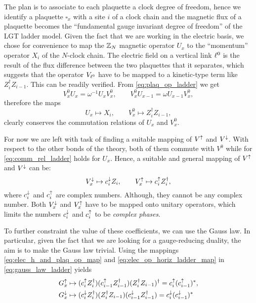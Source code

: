 The plan is to associate to each plaquette a clock degree of freedom, hence we identify a plaquette $\square_x$ with a site $i$ of a clock chain and the magnetic flux of a plaquette becomes the ``fundamental gauge invariant degree of freedom'' of the LGT ladder model.
Given the fact that we are working in the electric basis, we chose for convenience to map the $\mathbb{Z}_N$ magnetic operator $U_x$ to the ``momentum'' operator $X_i$ of the $N$-clock chain.
The electric field on a vertical link $\ell^0$ is the result of the flux difference between the two plaquettes that it separates, which suggests that the operator $V_{\ell^0}$ have to be mapped to a kinetic-type term like $Z_i^\dagger Z_{i-1}$.
This can be readily verified.
From \eqref{eq:plaq_op_ladder} we get
\begin{equation*}
    V^0_x U_x = \omega^{-1} U_x V_x^0, \qquad
    V^0_x U_{x-1} = \omega U_{x-1} V_x^0,
\end{equation*}
therefore the maps
\begin{equation*}
    U_x \mapsto X_i, \qquad
    V^0_x \mapsto Z_i^\dagger Z_{i-1},
    \label{eq:elec_h_and_plaq_op_map}
\end{equation*}
clearly conserves the commutation relations of $U_x$ and $V^0_x$.

For now we are left with task of finding a suitable mapping of $V^{\uparrow}$ and $V^{\downarrow}$.
With respect to the other bonds of the theory, both of them commute with $V^0$ while for \eqref{eq:comm_rel_ladder} holds for $U_x$.
Hence, a suitable and general mapping of $V^{\uparrow}$ and $V^{\downarrow}$ can be:
\begin{equation}
    V^{\downarrow}_x \mapsto c^{\downarrow}_i Z_i, \qquad
    V^{\uparrow}_x \mapsto c^{\uparrow}_i Z_i^\dagger,
    \label{eq:elec_op_horiz_ladder_map}
\end{equation}
where $c^{\downarrow}_i$ and $c^{\uparrow}_i$ are complex numbers.
Although, they cannot be any complex number.
Both $V^{\downarrow}_x$ and $V^{\uparrow}_x$ have to be mapped onto unitary operators, which limits the numbers $c^{\downarrow}_i$ and $c^{\uparrow}_i$ to be \emph{complex phases}.

To further constraint the value of these coefficients, we can use the Gauss law.
In particular, given the fact that we are looking for a gauge-reducing duality, the aim is to make the Gauss law trivial.
Using the mappings \eqref{eq:elec_h_and_plaq_op_map} and \eqref{eq:elec_op_horiz_ladder_map} in \eqref{eq:gauss_law_ladder} yields
\begin{equation}
    \begin{split}
        G^\uparrow_x & \mapsto
        (c^{\uparrow}_i Z_i^\dagger) (c^{\uparrow}_{i-1} Z_{i-1}^\dagger) (Z_i^\dagger Z_{i-1})^\dagger
        = c^{\uparrow}_i (c^{\uparrow}_{i-1})^*, \\
        G^\downarrow_x & \mapsto
        (c^{\downarrow}_i Z_i^\dagger) (Z_i^\dagger Z_{i-1}) (c^{\downarrow}_{i-1} Z_{i-1}^\dagger)
        = c^{\downarrow}_i (c^{\downarrow}_{i-1})^*
    \end{split}
    \label{eq:gauss_law_map_ladder}
\end{equation}

